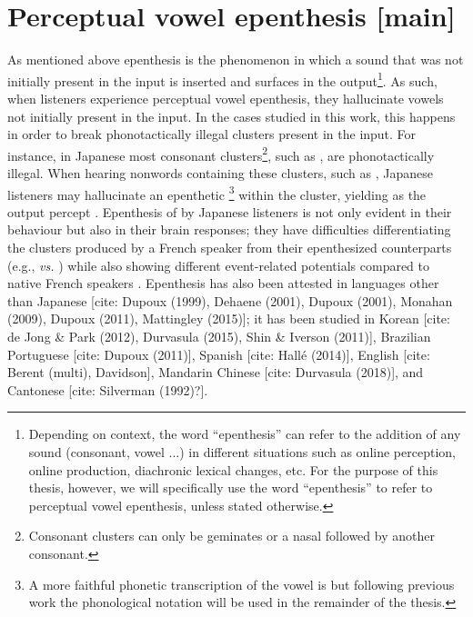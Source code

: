 {\color{red}
\section{Perceptual vowel epenthesis [main]}

As mentioned above epenthesis is the phenomenon in which a sound that was not initially present in the input is inserted and surfaces in the output\footnote{Depending on context, the word ``epenthesis'' can refer to the addition of any sound (consonant, vowel ...) in different situations such as online perception, online production, diachronic lexical changes, etc. For the purpose of this thesis, however, we will specifically use the word ``epenthesis'' to refer to perceptual vowel epenthesis, unless stated otherwise.}. As such, when listeners experience perceptual vowel epenthesis, they hallucinate vowels not initially present in the input. In the cases studied in this work, this happens in order to break phonotactically illegal clusters present in the input. For instance, in Japanese most consonant clusters\footnote{Consonant clusters can only be geminates or a nasal followed by another consonant.}, such as , are phonotactically illegal. When hearing nonwords containing these clusters, such as , Japanese listeners may hallucinate an epenthetic \footnote{A more faithful phonetic transcription of the vowel is \textipa{[W]} but following previous work the phonological notation  will be used in the remainder of the thesis.} within the cluster, yielding  as the output percept \cite{dupoux1999}. Epenthesis of  by Japanese listeners is not only evident in their behaviour but also in their brain responses; they have difficulties differentiating the clusters produced by a French speaker from their epenthesized counterparts (e.g.,  \textit{vs.} ) while also showing different event-related potentials compared to native French speakers \cite{dehaene2000}.
Epenthesis has also been attested in languages other than Japanese [cite: Dupoux (1999), Dehaene (2001), Dupoux (2001), Monahan (2009), Dupoux (2011), Mattingley (2015)]; it has been studied in Korean [cite: de Jong \& Park (2012), Durvasula (2015), Shin \& Iverson (2011)], Brazilian Portuguese [cite: Dupoux (2011)], Spanish [cite: Hallé (2014)], English [cite: Berent (multi), Davidson], Mandarin Chinese [cite: Durvasula (2018)], and Cantonese [cite: Silverman (1992)?]. 



}
